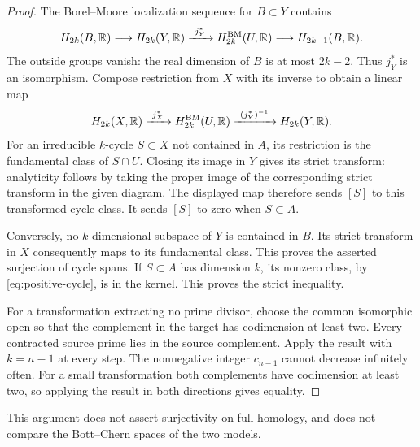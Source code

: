 \begin{proof}
The Borel--Moore localization sequence for $B\subset Y$ contains
\[
 H_{2k}(B,\mathbb R)\longrightarrow H_{2k}(Y,\mathbb R)
 \xrightarrow{\ j_Y^*\ }H_{2k}^{\mathrm{BM}}(U,\mathbb R)
 \longrightarrow H_{2k-1}(B,\mathbb R).
\]
The outside groups vanish: the real dimension of $B$ is at most $2k-2$.
Thus $j_Y^*$ is an isomorphism.  Compose restriction from $X$ with its
inverse to obtain a linear map
\[
 H_{2k}(X,\R)\xrightarrow{\ j_X^*\ }H_{2k}^{\mathrm{BM}}(U,\R)
 \xrightarrow{\ (j_Y^*)^{-1}\ }H_{2k}(Y,\R).
\]
For an irreducible $k$-cycle $S\subset X$ not contained in $A$, its
restriction is the fundamental class of $S\cap U$.  Closing its image in
$Y$ gives its strict transform: analyticity follows by taking the proper
image of the corresponding strict transform in the given diagram.
The displayed map therefore sends $[S]$ to this transformed cycle class.
It sends $[S]$ to zero when $S\subset A$.

Conversely, no $k$-dimensional subspace of $Y$ is contained in $B$.
Its strict transform in $X$ consequently maps to its fundamental class.
This proves the asserted surjection of cycle spans.  If $S\subset A$
has dimension $k$, its nonzero class, by \eqref{eq:positive-cycle}, is
in the kernel.  This proves the strict inequality.

For a transformation extracting no prime divisor, choose the common
isomorphic open so that the complement in the target has codimension
at least two.  Every contracted source prime lies in the source
complement.  Apply the result with $k=n-1$ at every step.  The
nonnegative integer $c_{n-1}$ cannot decrease infinitely often.  For a
small transformation both complements have codimension at least two,
so applying the result in both directions gives equality.
\end{proof}

This argument does not assert surjectivity on full homology, and does
not compare the Bott--Chern spaces of the two models.

